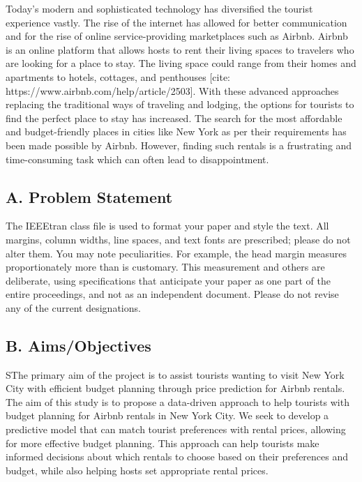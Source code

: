 \documentclass[conference]{IEEEtran}
\begin{document}
Today’s modern and sophisticated technology has diversified the tourist experience vastly.
 The rise of the internet has allowed for better communication and for the rise of online service-providing marketplaces such as Airbnb. Airbnb is an online 
 platform that allows hosts to rent their living spaces to travelers who are looking for a place to stay. The living space could range from their homes and 
 apartments to hotels, cottages, and penthouses [cite: https://www.airbnb.com/help/article/2503]. With these advanced approaches replacing the traditional ways
  of traveling and lodging, the options for tourists to find the perfect place to stay has increased. The search for the most affordable and budget-friendly
places in cities like New York as per their requirements has been made possible by Airbnb. However, finding such rentals is a frustrating and 
time-consuming task which can often lead to disappointment.

\subsection*{\centering A. Problem Statement}

The IEEEtran class file is used to format your paper and style the text. All margins, 
column widths, line spaces, and text fonts are prescribed; please do not 
alter them. You may note peculiarities. For example, the head margin
measures proportionately more than is customary. This measurement 
and others are deliberate, using specifications that anticipate your paper 
as one part of the entire proceedings, and not as an independent document. 
Please do not revise any of the current designations.

\subsection*{\centering B. Aims/Objectives}
SThe primary aim of the project is to assist tourists wanting to visit New York City with efficient budget planning through price prediction for Airbnb rentals. 
The aim of this study is to propose a data-driven approach to help tourists with budget planning for Airbnb rentals in New York City. We seek to develop a predictive model that can match tourist preferences with rental prices, allowing for more effective budget planning. This approach can help tourists make informed decisions about which rentals to choose based on their preferences and budget, while also helping hosts set appropriate rental prices.
\end{document}
